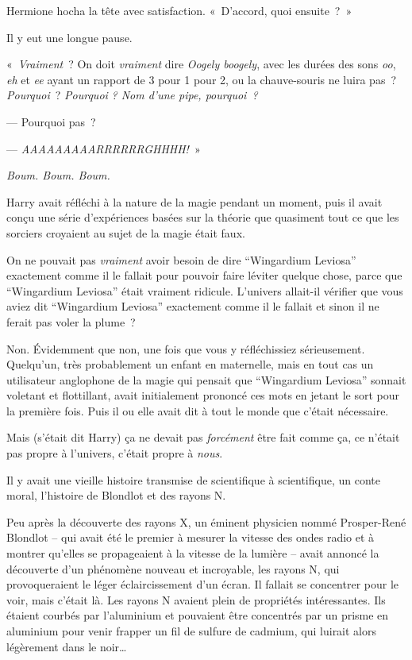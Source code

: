 Hermione hocha la tête avec satisfaction. «~D'accord, quoi ensuite~?~»

Il y eut une longue pause.

«~\emph{Vraiment}~? On doit \emph{vraiment} dire \emph{Oogely boogely}, avec les durées des sons \emph{oo}, \emph{eh} et \emph{ee} ayant un rapport de 3 pour 1 pour 2, ou la chauve-souris ne luira pas~? \emph{Pourquoi}~? \emph{Pourquoi} \emph{? Nom d'une pipe, pourquoi~?}

--- Pourquoi pas~?

--- \emph{AAAAAAAAARRRRRRGHHHH!}~»

\emph{Boum. Boum. Boum.}

Harry avait réfléchi à la nature de la magie pendant un moment, puis il avait conçu une série d'expériences basées sur la théorie que quasiment tout ce que les sorciers croyaient au sujet de la magie était faux.

On ne pouvait pas \emph{vraiment} avoir besoin de dire “Wingardium Leviosa” exactement comme il le fallait pour pouvoir faire léviter quelque chose, parce que “Wingardium Leviosa” était vraiment ridicule. L'univers allait-il vérifier que vous aviez dit “Wingardium Leviosa” exactement comme il le fallait et sinon il ne ferait pas voler la plume~?

Non. Évidemment que non, une fois que vous y réfléchissiez sérieusement. Quelqu'un, très probablement un enfant en maternelle, mais en tout cas un utilisateur anglophone de la magie qui pensait que “Wingardium Leviosa” sonnait voletant et flottillant, avait initialement prononcé ces mots en jetant le sort pour la première fois. Puis il ou elle avait dit à tout le monde que c'était nécessaire.

Mais (s'était dit Harry) ça ne devait pas \emph{forcément} être fait comme ça, ce n'était pas propre à l'univers, c'était propre à \emph{nous}.

Il y avait une vieille histoire transmise de scientifique à scientifique, un conte moral, l'histoire de Blondlot et des rayons N.

Peu après la découverte des rayons X, un éminent physicien nommé Prosper-René Blondlot -- qui avait été le premier à mesurer la vitesse des ondes radio et à montrer qu'elles se propageaient à la vitesse de la lumière -- avait annoncé la découverte d'un phénomène nouveau et incroyable, les rayons N, qui provoqueraient le léger éclaircissement d'un écran. Il fallait se concentrer pour le voir, mais c'était là. Les rayons N avaient plein de propriétés intéressantes. Ils étaient courbés par l'aluminium et pouvaient être concentrés par un prisme en aluminium pour venir frapper un fil de sulfure de cadmium, qui luirait alors légèrement dans le noir…

